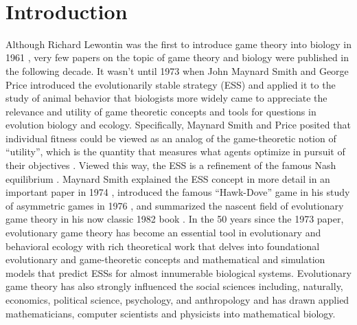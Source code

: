 \documentclass[11pt]{article}
\begin{document}
\vspace{3em}
\\

\clearpage
\section{Introduction}

Although Richard Lewontin was the first to introduce game theory into biology in 1961 \cite{Lewontin:1961}, very few papers on the topic of game theory and biology were published in the following decade. It wasn't until 1973 when John Maynard Smith and George Price introduced the evolutionarily stable strategy (ESS) and applied it to the study of animal behavior \cite{Maynard-Smith:Price:1973} that biologists more widely came to appreciate the relevance and utility of game theoretic concepts and tools for questions in evolution biology and ecology. Specifically, Maynard Smith and Price posited that individual fitness could be viewed as an analog of the game-theoretic notion of ``utility'', which is the quantity that measures what agents optimize in pursuit of their objectives \cite{Myerson:1991}. Viewed this way, the ESS is a refinement of the famous Nash equilibrium \cite{Nash:1950}. Maynard Smith explained the ESS concept in more detail in an important paper in 1974 \cite{Maynard-Smith:1974}, introduced the famous ``Hawk-Dove'' game in his study of asymmetric games in 1976 \cite{Maynard-Smith:Parker:1976}, and summarized the nascent field of evolutionary game theory in his now classic 1982 book \cite{MaynardSmith:1982}. In the 50 years since the 1973 paper, evolutionary game theory has become an essential tool in evolutionary and behavioral ecology with rich theoretical work that delves into foundational evolutionary and game-theoretic concepts and mathematical and simulation models that predict ESSs for almost innumerable biological systems. Evolutionary game theory has also strongly influenced the social sciences including, naturally, economics, political science, psychology, and anthropology and has drawn applied mathematicians, computer scientists and physicists into mathematical biology.
\end{document}

